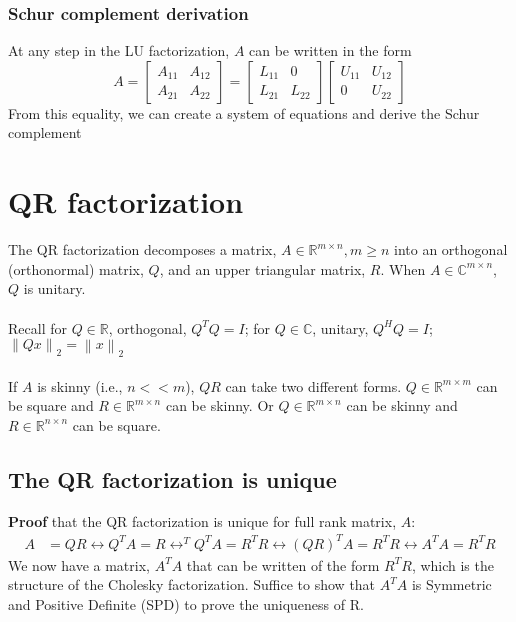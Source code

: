 \documentclass{article}
\newcommand{\norm}[2]{\left\lVert#1\right\rVert_#2}
\begin{document}
\subsubsection{Schur complement derivation}
At any step in the LU factorization, $A$ can be written in the form
\begin{equation*}
    A = \begin{bmatrix} A_{11} & A_{12}\\ A_{21} & A_{22}\end{bmatrix} = \begin{bmatrix} L_{11} & 0\\ L_{21} & L_{22}\end{bmatrix}
    \begin{bmatrix} U_{11} & U_{12}\\ 0 & U_{22}\end{bmatrix}
\end{equation*}
From this equality, we can create a system of equations and derive the Schur complement

\section{QR factorization}
The QR factorization decomposes a matrix, $A \in \mathbb{R}^{m \times n}, m \geq n$ into an orthogonal (orthonormal) matrix, $Q$, and an upper triangular matrix, $R$. When $A \in \mathbb{C}^{m \times n}$, $Q$ is unitary.\\ \\
Recall for $Q \in \mathbb{R}$, orthogonal, $Q^TQ = I$; for $Q \in \mathbb{C}$, unitary, $Q^HQ = I$; $\norm{Qx}{2} = \norm{x}{2}$\\ \\
If $A$ is skinny (i.e., $n << m$), $QR$ can take two different forms. $Q \in \mathbb{R}^{m \times m}$ can be square and $R \in \mathbb{R}^{m \times n}$ can be skinny. Or $Q \in \mathbb{R}^{m \times n}$ can be skinny and $R \in \mathbb{R}^{n \times n}$ can be square.

\subsection{The QR factorization is unique}
\textbf{Proof} that the QR factorization is unique for full rank matrix, $A$:
\begin{align*}
    A &= QR \longleftrightarrow Q^TA = R \longleftrightarrow ^TQ^TA = R^TR \longleftrightarrow (QR)^TA = R^TR \longleftrightarrow A^TA = R^TR
\end{align*}
We now have a matrix, $A^TA$ that can be written of the form $R^TR$, which is the structure of the Cholesky factorization. Suffice to show that $A^TA$ is Symmetric and Positive Definite (SPD) to prove the uniqueness of R.
\end{document}
